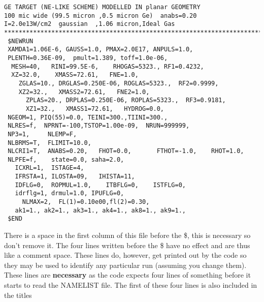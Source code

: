 \begin{verbatim}
GE TARGET (NE-LIKE SCHEME) MODELLED IN planar GEOMETRY                          
100 mic wide (99.5 micron ,0.5 micron Ge)  anabs=0.20                           
I=2.0e13W/cm2  gaussian  ,1.06 micron,Ideal Gas                                 
************************************************************************        
 $NEWRUN                                                                        
 XAMDA1=1.06E-6, GAUSS=1.0, PMAX=2.0E17, ANPULS=1.0,                            
 PLENTH=0.36E-09,  pmult=1.389, toff=1.0e-06,                                   
  MESH=40,   RINI=99.5E-6,    RHOGAS=5323., RF1=0.4232,                         
  XZ=32.0,    XMASS=72.61,   FNE=1.0,                                           
    ZGLAS=10., DRGLAS=0.250E-06, ROGLAS=5323.,  RF2=0.9999,                     
    XZ2=32.,   XMASS2=72.61,   FNE2=1.0,                                        
      ZPLAS=20., DRPLAS=0.250E-06, ROPLAS=5323.,  RF3=0.9181,                   
      XZ1=32.,   XMASS1=72.61,   HYDROG=0.0,                                    
 NGEOM=1, PIQ(55)=0.0, TEINI=300.,TIINI=300.,                                   
 NLRES=f,  NPRNT=-100,TSTOP=1.00e-09,  NRUN=999999, 
 NP3=1,     NLEMP=F,                                                            
 NLBRMS=T,  FLIMIT=10.0,                                                        
 NLCRI1=T,  ANABS=0.20,   FHOT=0.0,       FTHOT=-1.0,    RHOT=1.0,              
 NLPFE=f,    state=0.0, saha=2.0,                                
   ICXRL=1,  ISTAGE=4,                                                          
   IFRSTA=1, ILOSTA=09,   IHISTA=11,                                            
   IDFLG=0,  ROPMUL=1.0,    ITBFLG=0,    ISTFLG=0,                              
   idrflg=1, drmul=1.0, IPUFLG=0,                                               
     NLMAX=2,  FL(1)=0.10e00,fl(2)=0.30,                                          
   ak1=1., ak2=1., ak3=1., ak4=1., ak8=1., ak9=1.,
 $END                                                                           
\end{verbatim}
There is a space in the first column of
this file before the \$, this is necessary so don't remove it.
The four lines written before the \$ have no effect and are thus like a
comment space. These lines do, however, get printed out by the code so
they may be used to identify any particular run
(assuming you change them). These lines are {\bf necessary} as the code
expects four lines of something before it starts to read the NAMELIST
file. The first of these four lines is also included in the titles
